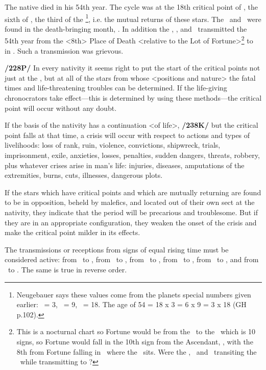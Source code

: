 The native died in his 54th year. The cycle was at the 18th critical point of \Saturn, the sixth of \Jupiter, the third of the \Sun\footnote{Neugebauer says these values come from the planets special numbers given earlier: \Saturn\, = 3, \Jupiter\, = 9, \Sun\, = 18. The age of 54 = 18 x 3 = 6 x 9 = 3 x 18 (GH p.102).}, i.e. the mutual returns of these stars. The \Sun\, and \Jupiter\, were found in the death-bringing month, \Sagittarius. In addition the \Sun, \Jupiter, and \Mars\, transmitted the 54th year from the <8th> Place of Death <relative to the Lot of Fortune>\footnote{This is a nocturnal chart so Fortune would be from the \Moon\, to the \Sun\, which is 10 signs, so Fortune would fall in the 10th sign from the Ascendant, \Pisces, with the 8th from Fortune falling in \Libra\, where the \Moon\, sits. Were the \Sun, \Jupiter\, and \Mars\, transiting the \Moon\ while transmitting to \Saturn ?} to \Saturn\, in \Sagittarius. Such a transmission was grievous.

\textbf{/228P/} In every nativity it seems right to put the start of the critical points not just at the \Moon, but at all of the stars from whose <positions and nature> the fatal times and life-threatening troubles can be determined. If the life-giving chronocrators take effect—this is determined by using these methods—the critical point will occur without any doubt. 

If the basis of the nativity has a continuation <of life>, \textbf{/238K/} but the critical point falls at that time, a crisis will occur with respect to actions and types of livelihoods: loss of rank, ruin, violence, convictions, shipwreck, trials, imprisonment, exile, anxieties, losses,
penalties, sudden dangers, threats, robbery, plus whatever crises arise in man’s life: injuries, diseases, amputations of the extremities, burns, cuts, illnesses, dangerous plots. 

If the stars which have critical points and which are mutually returning are found to be in opposition, beheld by malefics, and located out
of their own sect at the nativity, they indicate that the period will be precarious and troublesome. But if they are in an appropriate configuration, they weaken the onset of the crisis and make the critical point milder in its effects. 

The transmissions or receptions from signs of equal rising time must be considered active: from \Aries\, to \Pisces, from \Taurus\, to \Aquarius, from \Gemini\, to \Capricorn, from \Cancer\, to \Sagittarius, from \Leo\, to \Scorpio, and from \Virgo\, to \Libra. The same is true in reverse order.

